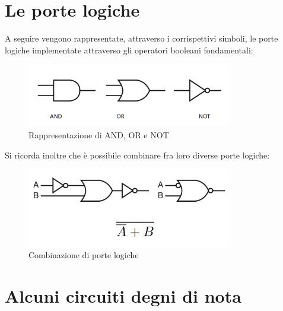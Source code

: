 \documentclass[class=book, crop=false]{standalone}
\begin{document}
\section{Le porte logiche}
A seguire vengono rappresentate, attraverso i corrispettivi simboli, le porte logiche implementate attraverso gli operatori booleani fondamentali:
\begin{figure}[H]
	\centering
	\includegraphics[width=0.8\textwidth,keepaspectratio]{porte_logiche.png}
	\caption{Rappresentazione di AND, OR e NOT}
\end{figure}

Si ricorda inoltre che è possibile combinare fra loro diverse porte logiche:
\begin{figure}[H]
	\centering
	\includegraphics[width=0.8\textwidth,keepaspectratio]{combinazione_porte.png}
	\caption{Combinazione di porte logiche}
\end{figure}

\section{Alcuni circuiti degni di nota}
\end{document}

